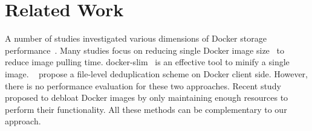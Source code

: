 \section{Related Work}
\label{sec:related}


A number of studies investigated various dimensions of Docker storage
performance~\cite{dockerssd,shifter,slacker,exoclones,docker-driver-eval,
improve-cow-container-drivers,cntr,slacker}.
Many studies focus on
reducing single Docker image size~\cite{Cimplifier, } to reduce image pulling time.
docker-slim~\cite{dockerslim} is an effective tool to 
minify a single image.
~\cite{xxx}
propose a file-level deduplication scheme on Docker client side.
However, there is no performance evaluation for these two approaches.
Recent study~\cite{Cimplifier}
proposed to debloat Docker images by only maintaining
enough resources to perform their functionality.
All these methods can be complementary to our approach.
%
%
%
%
%
%
